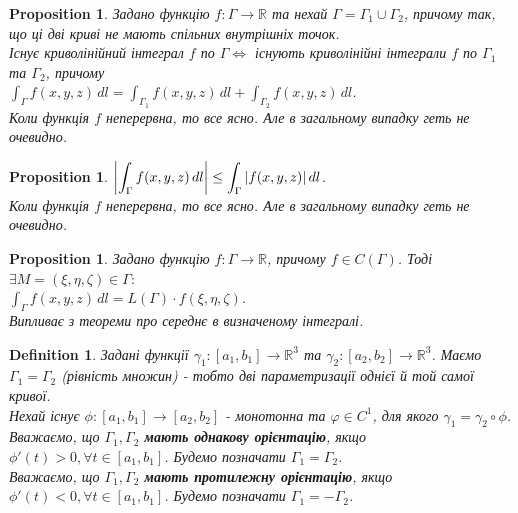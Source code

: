\documentclass[a4paper, 10pt]{article}
\theoremstyle{theoremdd}
\theoremstyle{theoremdd}
\newtheorem{definition}[theorem]{Definition}
\theoremstyle{theoremdd}
\theoremstyle{theoremdd}
\theoremstyle{theoremdd}
\newtheorem{proposition}[theorem]{Proposition}
\theoremstyle{theoremdd}
\theoremstyle{theoremdd}
\theoremstyle{theoremdd}
\begin{document}
\begin{proposition}
Задано функцію $f: \Gamma \to \mathbb{R}$ та нехай $\Gamma = \Gamma_1 \cup \Gamma_2$, причому так, що ці дві криві не мають спільних внутрішніх точок.\\
Існує криволінійний інтеграл $f$ по $\Gamma \iff$ існують криволінійні інтеграли $f$ по $\Gamma_1$ та $\Gamma_2$, причому\\
$\displaystyle\int_\Gamma f(x,y,z)\,dl = \int_{\Gamma_1} f(x,y,z)\,dl + \int_{\Gamma_2} f(x,y,z)\,dl$.\\
\textit{Коли функція $f$ неперервна, то все ясно. Але в загальному випадку геть не очевидно.}
\end{proposition}

\begin{proposition}
$\displaystyle \abs{\int_\Gamma f(x,y,z)\,dl} \leq \int_\Gamma |f(x,y,z)|\,dl$.\\
\textit{Коли функція $f$ неперервна, то все ясно. Але в загальному випадку геть не очевидно.}
\end{proposition}

\begin{proposition}
Задано функцію $f: \Gamma \to \mathbb{R}$, причому $f \in C(\Gamma)$. Тоді $\exists M = (\xi,\eta,\zeta) \in \Gamma:$\\
$\displaystyle\int_\Gamma f(x,y,z)\,dl = L(\Gamma) \cdot f(\xi,\eta,\zeta)$.\\
\textit{Випливає з теореми про середнє в визначеному інтегралі.}
\end{proposition}

\begin{definition}
Задані функції $\gamma_1: [a_1,b_1] \to \mathbb{R}^3$ та $\gamma_2: [a_2,b_2] \to \mathbb{R}^3$. Маємо $\Gamma_1 = \Gamma_2$ (рівність множин) - тобто дві параметризації однієї й той самої кривої.\\
Нехай існує $\phi: [a_1,b_1] \to [a_2,b_2]$ - монотонна та $\varphi \in C^1$, для якого $\gamma_1 = \gamma_2 \circ \phi$.\\
Вважаємо, що $\Gamma_1, \Gamma_2$ \textbf{мають однакову орієнтацію}, якщо $\phi'(t) > 0, \forall t \in [a_1,b_1]$. Будемо позначати $\Gamma_1 = \Gamma_2$.\\
Вважаємо, що $\Gamma_1, \Gamma_2$ \textbf{мають протилежну орієнтацію}, якщо $\phi'(t) < 0, \forall t \in [a_1,b_1]$. Будемо позначати $\Gamma_1 = -\Gamma_2$.
\end{definition}
\end{document}
